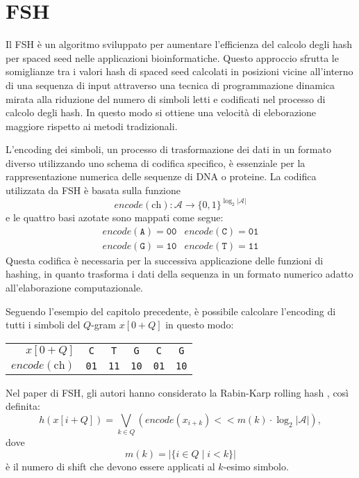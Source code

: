 \section{FSH}
\label{sec:FSH}

Il \ac{FSH} \cite{girotto2018fsh} è un algoritmo sviluppato per aumentare l'efficienza del calcolo degli hash per spaced seed nelle applicazioni bioinformatiche. Questo approccio sfrutta le somiglianze tra i valori hash di spaced seed calcolati in posizioni vicine all'interno di una sequenza di input attraverso una tecnica di programmazione dinamica mirata alla riduzione del numero di simboli letti e codificati nel processo di calcolo degli hash. In questo modo si ottiene una velocità di eleborazione maggiore rispetto ai metodi tradizionali.

L'encoding dei simboli, un processo di trasformazione dei dati in un formato diverso utilizzando uno schema di codifica specifico, è essenziale per la rappresentazione numerica delle sequenze di DNA o proteine. La codifica utilizzata da \acs{FSH} è basata sulla funzione \[ encode(\mathrm{ch}): \mathcal{A} \to \{0, 1\}^{\log_2 |\mathcal{A}|} \] e le quattro basi azotate sono mappati come segue: \[ \begin{matrix}
	encode(\texttt{A}) = \texttt{00}  &  encode(\texttt{C}) = \texttt{01} \\
	encode(\texttt{G}) = \texttt{10}  &  encode(\texttt{T}) = \texttt{11} 
\end{matrix} \]
Questa codifica è necessaria per la successiva applicazione delle funzioni di hashing, in quanto trasforma i dati della sequenza in un formato numerico adatto all'elaborazione computazionale.


\begin{example}
	Seguendo l'esempio del capitolo precedente, è possibile calcolare l'encoding di tutti i simboli del $Q$-gram $x[0 + Q]$ in questo modo:
	
	{
		\centering
		\begin{tabular}{r | ccccc}
			$x[0 + Q]$ & \texttt{C} & \texttt{T} & \texttt{G} & \texttt{C} & \texttt{G} \\
			$encode(\mathrm{ch})$ & \texttt{01} & \texttt{11} & \texttt{10} & \texttt{01} & \texttt{10} 
		\end{tabular}
		
	}
\end{example}

Nel paper di \acs{FSH}, gli autori hanno considerato la Rabin-Karp rolling hash \cite{cormen2009introduction}, così definita: \[ h\left( x[i + Q] \right) = \bigvee_{k \in Q} \left( encode(x_{i + k}) <\!< m(k) \cdot \log_2 |\mathcal{A}| \right), \] dove \[ m(k) = \left| \{ i \in Q \; | \; i < k \} \right| \] è il numero di shift che devono essere applicati al $k$-esimo simbolo.

